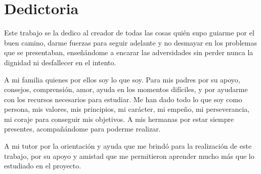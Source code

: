 \chapter*{Dedictoria}
\renewcommand{\footrulewidth}{0.0pt}%
Este trabajo se la dedico al creador de todas las cosas qui\'en supo guiarme por el buen
camino, darme fuerzas para seguir adelante y no desmayar en los
problemas que se presentaban, ense\~n\'andome a encarar las
adversidades sin perder nunca la dignidad ni desfallecer en el
intento.

A mi familia quienes por ellos soy lo que soy.
Para mis padres por su apoyo, consejos, comprensi\'on, amor, ayuda
en los momentos dif\'iciles, y por ayudarme con los recursos necesarios
para estudiar. Me han dado todo lo que soy como persona, mis
valores, mis principios, mi car\'acter, mi empe\~no, mi perseverancia,
mi coraje para conseguir mis objetivos.
A mis hermanas por estar siempre presentes, acompa\~n\'andome para
poderme realizar. 


A mi tutor por la orientaci\'on y ayuda que me brind\'o para la realizaci\'on de este trabajo, por su apoyo y amistad que me permitieron aprender mucho m\'as que lo estudiado en el proyecto.
